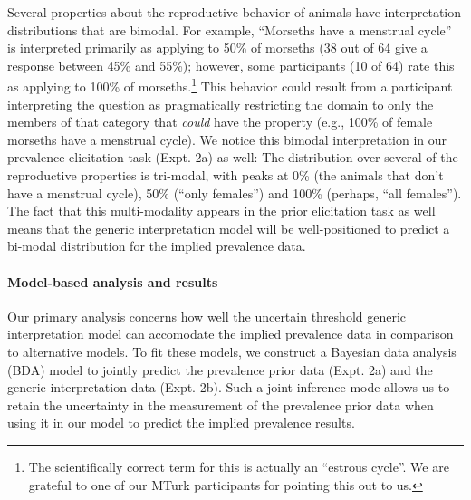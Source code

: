 \documentclass[floatsintext,man]{apa6}
\theoremstyle{definition}
\theoremstyle{definition}
\theoremstyle{definition}
\theoremstyle{remark}
\begin{document}
Several properties about the reproductive behavior of animals have
interpretation distributions that are bimodal. For example,
\enquote{Morseths have a menstrual cycle} is interpreted primarily as
applying to 50\% of morseths (38 out of 64 give a response between 45\%
and 55\%); however, some participants (10 of 64) rate this as applying
to 100\% of morseths.\footnote{The scientifically correct term for this
  is actually an \enquote{estrous cycle}. We are grateful to one of our
  MTurk participants for pointing this out to us.} This behavior could
result from a participant interpreting the question as pragmatically
restricting the domain to only the members of that category that
\emph{could} have the property (e.g., 100\% of female morseths have a
menstrual cycle). We notice this bimodal interpretation in our
prevalence elicitation task (Expt. 2a) as well: The distribution over
several of the reproductive properties is tri-modal, with peaks at 0\%
(the animals that don't have a menstrual cycle), 50\% (\enquote{only
females}) and 100\% (perhaps, \enquote{all females}). The fact that this
multi-modality appears in the prior elicitation task as well means that
the generic interpretation model will be well-positioned to predict a
bi-modal distribution for the implied prevalence data.

\paragraph{Model-based analysis and
results}\label{model-based-analysis-and-results-1}

Our primary analysis concerns how well the uncertain threshold generic
interpretation model can accomodate the implied prevalence data in
comparison to alternative models. To fit these models, we construct a
Bayesian data analysis (BDA) model to jointly predict the prevalence
prior data (Expt. 2a) and the generic interpretation data (Expt. 2b).
Such a joint-inference mode allows us to retain the uncertainty in the
measurement of the prevalence prior data when using it in our model to
predict the implied prevalence results.
\end{document}
